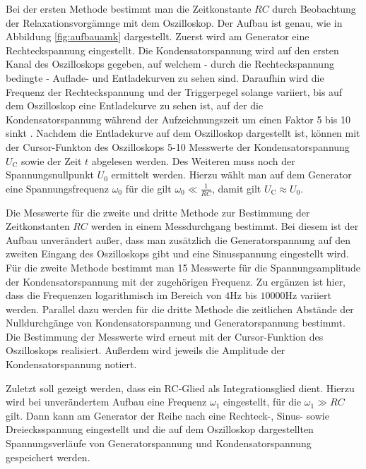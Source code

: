 Bei der ersten Methode bestimmt man die Zeitkonstante $RC$ durch Beobachtung der Relaxationsvorgämnge mit dem Oszilloskop.
Der Aufbau ist genau, wie in Abbildung \ref{fig:aufbauamk} dargestellt.
Zuerst wird am Generator eine Rechteckspannung eingestellt.
Die Kondensatorspannung wird auf den ersten Kanal des Oszilloskops gegeben, auf welchem - durch
die Rechteckspannung bedingte - Auflade- und Entladekurven zu sehen sind.
Daraufhin wird die Frequenz der Rechteckspannung und der Triggerpegel solange variiert, bis
auf dem Oszilloskop eine Entladekurve zu sehen ist, auf der die Kondensatorspannung während der
Aufzeichnungszeit um einen Faktor 5 bis 10 sinkt \cite{Anleitung}.
Nachdem die Entladekurve auf dem Oszilloskop dargestellt ist, können mit der Cursor-Funkton
des Oszilloskops 5-10 Messwerte der Kondensatorspannung $U_{\text{C}}$ sowie der Zeit $t$
abgelesen werden.
Des Weiteren muss noch der Spannungsnullpunkt $U_0$ ermittelt werden.
Hierzu wählt man auf dem Generator eine Spannungsfrequenz $\omega_0$ für die gilt 
$\omega_0 \ll \frac{1}{RC}$, damit gilt $U_{\text{C}} \approx U_0$.

Die Messwerte für die zweite und dritte Methode zur Bestimmung der Zeitkonstanten $RC$ werden
in einem Messdurchgang bestimmt.
Bei diesem ist der Aufbau unverändert außer, dass man zusätzlich die Generatorspannung auf den zweiten Eingang des Oszilloskops gibt und eine Sinusspannung eingestellt wird.
Für die zweite Methode bestimmt man 15 Messwerte für die Spannungsamplitude der Kondensatorspannung mit der zugehörigen Frequenz. Zu ergänzen ist hier, dass die Frequenzen logarithmisch im Bereich von $4 \si{\Hz}$ bis $10000 \si{\Hz}$ variiert werden. 
Parallel dazu %
werden für die dritte Methode die zeitlichen Abstände der Nulldurchgänge von Kondensatorspannung und Generatorspannung bestimmt.
Die Bestimmung der Messwerte wird erneut mit der Cursor-Funktion des Oszilloskops realisiert.
Außerdem wird jeweils die Amplitude der Kondensatorspannung notiert.

Zuletzt soll gezeigt werden, dass ein RC-Glied als Integrationsglied dient.
Hierzu wird bei unverändertem Aufbau eine Frequenz $\omega_1$ eingestellt, für die $\omega_1 \gg RC$ gilt. Dann kann am Generator der Reihe nach eine Rechteck-, Sinus- sowie Dreiecksspannung eingestellt und die auf dem Oszilloskop dargestellten Spannungsverläufe von Generatorspannung und Kondensatorspannung gespeichert werden.


